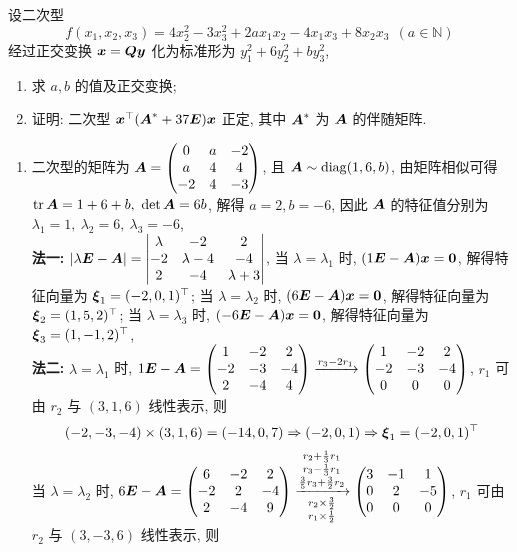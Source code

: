 \begin{example}
    设二次型 $$f(x_1,x_2,x_3)=4x_2^2-3x_3^2+2ax_1x_2-4x_1x_3+8x_2x_3~~(a\in\mathbb{N})$$
    经过正交变换 $\vb*{x}=\vb*{Qy}$ 化为标准形为 $y_1^2+6y_2^2+by_3^2$,
    \begin{enumerate}[label=(\arabic{*})]
        \item 求 $a,b$ 的值及正交变换;
        \item 证明: 二次型 $\vb*{x}^\top\qty(\vb*{A}^*+37\vb*{E})\vb*{x}$ 正定, 其中 $\vb*{A}^*$ 为 $\vb*{A}$ 的伴随矩阵.
    \end{enumerate}
\end{example}
\begin{solution}
    \begin{enumerate}[label=(\arabic{*})]
        \item 二次型的矩阵为 $\vb*{A}=\mqty(0&a&-2\\a&4&4\\-2&4&-3)$, 且 $\vb*{A}\sim\mathrm{diag}(1,6,b)$, 由矩阵相似可得 $\tr\vb*{A}=1+6+b,~\det\vb*{A}=6b$, 解得 $a=2,b=-6$, 因此 $\vb*{A}$ 的特征值分别为 $\lambda_1=1,~\lambda_2=6,~\lambda_3=-6$, \\
              \textbf{法一: }$|\lambda\vb*{E}-\vb*{A}|=\mqty|\lambda&-2&2\\-2&\lambda-4&-4\\2&-4&\lambda+3|$, 当 $\lambda=\lambda_1$ 时, $\qty(1\vb*{E}-\vb*{A})\vb*{x}=\vb*{0}$, 解得特征向量为 $\vb*{\xi}_1=(-2,0,1)^\top$; 当 $\lambda=\lambda_2$ 时,
              $(6\vb*{E}-\vb*{A})\vb*{x}=\vb*{0}$, 解得特征向量为 $\vb*{\xi}_2=(1,5,2)^\top$; 当 $\lambda=\lambda_3$ 时, $(-6\vb*{E}-\vb*{A})\vb*{x}=\vb*{0}$, 解得特征向量为 $\vb*{\xi}_3=(1,-1,2)^\top$, \\
              \textbf{法二: }$\lambda=\lambda_1$ 时, $1\vb*{E}-\vb*{A}=\mqty(1&-2&2\\-2&-3&-4\\2&-4&4)\xrightarrow{r_3-2r_1}\mqty(1&-2&2\\-2&-3&-4\\0&0&0)$, $r_1$ 可由 $r_2$ 与 $(3,1,6)$ 线性表示,
              则 $$(-2,-3,-4)\times(3,1,6)=(-14,0,7)\Rightarrow (-2,0,1)\Rightarrow \vb*{\xi}_1=(-2,0,1)^\top$$
              当 $\lambda=\lambda_2$ 时, $6\vb*{E}-\vb*{A}=\mqty(6&-2&2\\-2&2&-4\\2&-4&9)\xrightarrow[\substack{r_2\times\frac{3}{2}\\r_1\times\frac{1}{2}}]{\substack{r_2+\frac{1}{3}r_1\\r_3-\frac{1}{3}r_1\\\frac{3}{5}r_3+\frac{3}{2}r_2}}\mqty(3&-1&1\\0&2&-5\\0&0&0)$, $r_1$ 可由 $r_2$ 与 $(3,-3,6)$ 线性表示, 则

\end{enumerate}
\end{solution}

